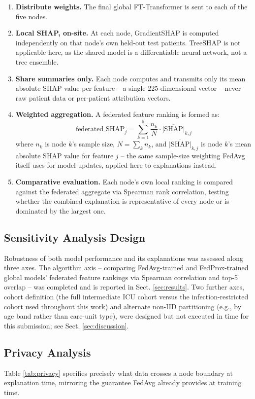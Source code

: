 \documentclass[runningheads]{llncs}
\begin{document}
\begin{enumerate}
\item \textbf{Distribute weights.} The final global FT-Transformer is sent to each of the five nodes.
\item \textbf{Local SHAP, on-site.} At each node, GradientSHAP is computed independently on that node's own held-out test patients. TreeSHAP is not applicable here, as the shared model is a differentiable neural network, not a tree ensemble.
\item \textbf{Share summaries only.} Each node computes and transmits only its mean absolute SHAP value per feature -- a single 225-dimensional vector -- never raw patient data or per-patient attribution vectors.
\item \textbf{Weighted aggregation.} A federated feature ranking is formed as:
\begin{equation}
\text{federated\_SHAP}_j = \sum_{k=1}^{5} \frac{n_k}{N} \cdot \overline{|\text{SHAP}|}_{k,j}
\label{eq:agg}
\end{equation}
where $n_k$ is node $k$'s sample size, $N = \sum_k n_k$, and $\overline{|\text{SHAP}|}_{k,j}$ is node $k$'s mean absolute SHAP value for feature $j$ -- the same sample-size weighting FedAvg itself uses for model updates, applied here to explanations instead.
\item \textbf{Comparative evaluation.} Each node's own local ranking is compared against the federated aggregate via Spearman rank correlation, testing whether the combined explanation is representative of every node or is dominated by the largest one.
\end{enumerate}

\subsection{Sensitivity Analysis Design}
Robustness of both model performance and its explanations was assessed along three axes. The algorithm axis -- comparing FedAvg-trained and FedProx-trained global models' federated feature rankings via Spearman correlation and top-5 overlap -- was completed and is reported in Sect. \ref{sec:results}. Two further axes, cohort definition (the full intermediate ICU cohort versus the infection-restricted cohort used throughout this work) and alternate non-IID partitioning (e.g., by age band rather than care-unit type), were designed but not executed in time for this submission; see Sect. \ref{sec:discussion}.

\subsection{Privacy Analysis}
Table \ref{tab:privacy} specifies precisely what data crosses a node boundary at explanation time, mirroring the guarantee FedAvg already provides at training time.
\end{document}
